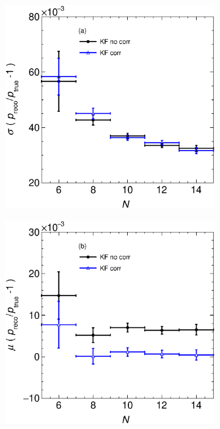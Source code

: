\begin{figure}[t]
     \centering
     \begin{subfigure}[b]{0.42\textwidth}
         \centering
         \includegraphics[width=\textwidth]{figures/ch4-KF_NDGArLite/Toy/RespVSN.eps}
         \caption{}
         \label{fig:ToyResPVSN_GArLite_Res}
     \end{subfigure}
     \begin{subfigure}[b]{0.42\textwidth}
         \centering
         \includegraphics[width=\textwidth]{figures/ch4-KF_NDGArLite/Toy/BiaspVSN.eps}

\end{subfigure}
\end{figure}
